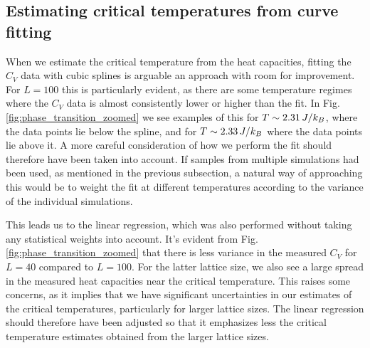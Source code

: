 \subsection{Estimating critical temperatures from curve fitting}\label{subsec_discussion:critical_temps_curvefit}
When we estimate the critical temperature from the heat capacities, fitting the $C_V$ data with cubic splines is arguable an approach with room for improvement. For $L=100$ this is particularly evident, as there are some temperature regimes where the $C_V$ data is almost consistently lower or higher than the fit. In Fig. \ref{fig:phase_transition_zoomed} we see examples of this for $T\sim2.31\,J/k_B$, where the data points lie below the spline, and for $T\sim2.33\,J/k_B$ where the data points lie above it. A more careful consideration of how we perform the fit should therefore have been taken into account. If samples from multiple simulations had been used, as mentioned in the previous subsection, a natural way of approaching this would be to weight the fit at different temperatures according to the variance of the individual simulations.  

This leads us to the linear regression, which was also performed without taking any statistical weights into account. It's evident from Fig. \ref{fig:phase_transition_zoomed} that there is less variance in the measured $C_V$ for $L=40$ compared to $L=100$. For the latter lattice size, we also see a large spread in the measured heat capacities near the critical temperature. This raises some concerns, as it implies that we have significant uncertainties in our estimates of the critical temperatures, particularly for larger lattice sizes. The linear regression should therefore have been adjusted so that it emphasizes less the critical temperature estimates obtained from the larger lattice sizes.


